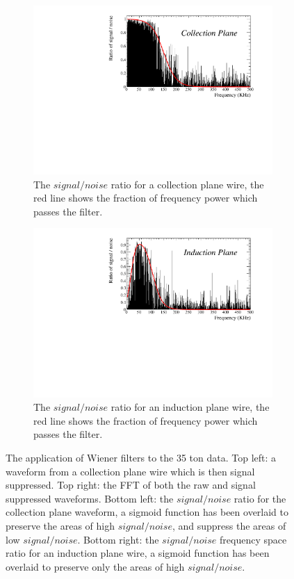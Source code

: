 \begin{figure}
\begin{subfigure}{0.48\textwidth}
    \centering
    \includegraphics[width=\textwidth]{Collection}
    \caption{The $signal/noise$ ratio for a collection plane wire, the red line shows the fraction of frequency power which passes the filter.}
    \label{fig:FreqCollection}
  \end{subfigure}%
  \hspace{0.03\textwidth}%
  \begin{subfigure}{0.48\textwidth}
    \centering
    \includegraphics[width=\textwidth]{Induction}
    \caption{The $signal/noise$ ratio for an induction plane wire, the red line shows the fraction of frequency power which passes the filter.}
    \label{fig:FreqInduction}
  \end{subfigure}
  \caption[Applying Wiener filters to the 35 ton data]
          {The application of Wiener filters to the 35 ton data. Top left: a waveform from a collection plane wire which is then signal suppressed. Top right: the FFT of both the raw and signal suppressed waveforms. Bottom left: the $signal/noise$ ratio for the collection plane waveform, a sigmoid function has been overlaid to preserve the areas of high $signal/noise$, and suppress the areas of low $signal/noise$. Bottom right: the $signal/noise$ frequency space ratio for an induction plane wire, a sigmoid function has been overlaid to preserve only the areas of high $signal/noise$.}
  \label{fig:FrequencyFilter}
\end{figure}

